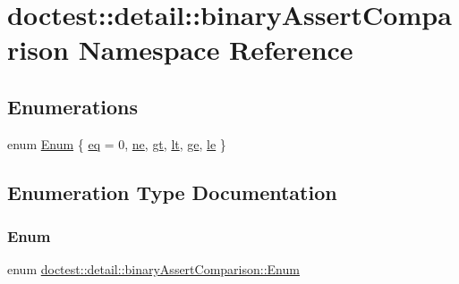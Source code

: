 \hypertarget{namespacedoctest_1_1detail_1_1binaryAssertComparison}{}\section{doctest\+:\+:detail\+:\+:binary\+Assert\+Comparison Namespace Reference}
\label{namespacedoctest_1_1detail_1_1binaryAssertComparison}
\subsection*{Enumerations}
\begin{DoxyCompactItemize}
\item 
enum \hyperlink{namespacedoctest_1_1detail_1_1binaryAssertComparison_a2117cafa5b007d26f2e0988f3a081569}{Enum} \{ \newline
\hyperlink{namespacedoctest_1_1detail_1_1binaryAssertComparison_a2117cafa5b007d26f2e0988f3a081569af644d2e3091c342ab78b12da1fcb06dc}{eq} = 0, 
\hyperlink{namespacedoctest_1_1detail_1_1binaryAssertComparison_a2117cafa5b007d26f2e0988f3a081569a851b5dd9ab390a406621216da112ac9c}{ne}, 
\hyperlink{namespacedoctest_1_1detail_1_1binaryAssertComparison_a2117cafa5b007d26f2e0988f3a081569a3efb665f41cd9490d9739e1ad228918e}{gt}, 
\hyperlink{namespacedoctest_1_1detail_1_1binaryAssertComparison_a2117cafa5b007d26f2e0988f3a081569aea0e8621512e05d78d88ff2d2c164a6b}{lt}, 
\newline
\hyperlink{namespacedoctest_1_1detail_1_1binaryAssertComparison_a2117cafa5b007d26f2e0988f3a081569a1de9460fcfb6a1681f13d54083f88313}{ge}, 
\hyperlink{namespacedoctest_1_1detail_1_1binaryAssertComparison_a2117cafa5b007d26f2e0988f3a081569a58efccb94f787a00914adc6db077347b}{le}
 \}
\end{DoxyCompactItemize}


\subsection{Enumeration Type Documentation}
\mbox{\label{namespacedoctest_1_1detail_1_1binaryAssertComparison_a2117cafa5b007d26f2e0988f3a081569}} 
\subsubsection{\texorpdfstring{Enum}{Enum}}
{\footnotesize\ttfamily enum \hyperlink{namespacedoctest_1_1detail_1_1binaryAssertComparison_a2117cafa5b007d26f2e0988f3a081569}{doctest\+::detail\+::binary\+Assert\+Comparison\+::\+Enum}}

